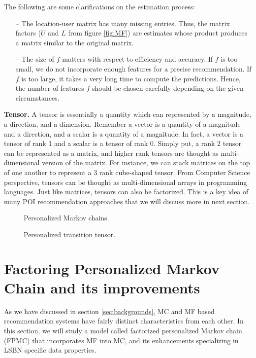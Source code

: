 \documentclass{sig-alternate}
\begin{document}
The following are some clarifications on the estimation process:
\begin{itemize}
\item[--] The location-user matrix has many missing entries. Thus, the matrix factors ($U$ and $L$ from figure \ref{fig:MF}) are 
estimates whose product produces a matrix similar to the original matrix.
\item[--] The size of $f$ matters with respect to efficiency and accuracy. If $f$ is too small, we do not 
incorporate enough features for a precise recommendation. If $f$ is too large, it takes a very long time 
to compute the predictions. Hence, the number of features $f$ should be chosen carefully depending on 
the given circumstances.
\end{itemize}

\textbf{Tensor.} A tensor is essentially a quantity which can represented by a magnitude, a direction, and 
a dimension. Remember a vector is a quantity of a magnitude and a direction, and a scalar 
is a quantity of a magnitude. In fact, a vector is a tensor of rank 1 and a scalar is a tensor 
of rank 0. Simply put, a rank 2 tensor can be represented as a matrix, and higher rank tensors 
are thought as multi-dimensional version of the matrix. For instance, we can stack matrices on 
the top of one another to represent a 3 rank cube-shaped tensor. From Computer Science perspective, tensors can be 
thought as multi-dimensional arrays in programming languages.
Just like matrices, tensors can also be factorized. This is a key idea of many POI recommendation approaches 
that we will discuss more in next section.

\begin{figure*}
\centering
{}
\caption{Personalized Markov chains.}
\label{fig:FPMC_naive}
\end{figure*}

\begin{figure}
\centering
{}
\caption{Personalized transition tensor.}
\label{fig:FPMC}
\end{figure}

\section{Factoring Personalized Markov Chain and its improvements}
\label{sec:fpmc}

As we have discussed in section \ref{sec:backgrounds}, MC and MF based recommendation systems
have fairly distinct characteristics from each other. In this section, we will study a model called 
factorized personalized Markov chain (FPMC) that incorporates MF into MC, and its 
enhancements specializing in LSBN specific data properties.
\end{document}
